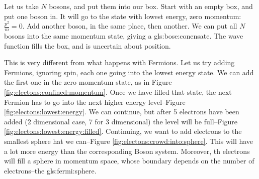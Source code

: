 \documentclass[]{article}
\begin{document}
Let us take $N$ bosons, and put them into our box. Start with an empty box, and put one boson in. It will go to the state with lowest energy, zero momentum: $\frac{p^2}{m}=0$. Add another boson, in the same place, then another. We can put all $N$ bosons into the same momentum state, giving a \gls{gls:bose:conensate}. The wave function fills the box, and is uncertain about position.


This is very different from what happens with Fermions. Let us try adding Fermions, ignoring spin, each one going into the lowest energy state. We can add the first one in the zero momentum state, as in Figure \ref{fig:electons:confined:momentum}. Once we have filled that state, the next Fermion has to go into the next higher energy level--Figure \ref{fig:electons:lowest:energy}. We can continue, but after 5 electrons have been added (2 dimensional case, 7 for 3 dimensional) the level will be full--Figure \ref{fig:electons:lowest:energy:filled}. Continuing, we want to add electrons to the smallest sphere hat we can--Figure \ref{fig:electons:crowd:into:sphere}. This will have a lot more energy than the corresponding Boson system. Moreover, th electrons will fill a sphere in momentum space, whose boundary depends on the number of electrons--the \gls{gls:fermi:sphere}. 
\end{document}
